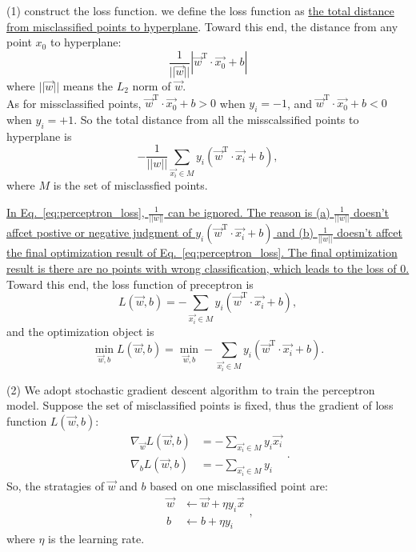 \documentclass[10pt,onecolumn]{book}
\begin{document}
(1) construct the loss function. we define the loss function as \uline{the total distance from misclassified points to hyperplane}. Toward this end, the distance from any point $x_{0}$ to hyperplane:
\begin{equation}
\frac{1}{||\vec{w}||} |\vec{w}^\mathrm{T}  \cdot \vec{x_{0}} + b|
\end{equation}
where ${||\vec{w}||}$ means the $L_{2}$ norm of $\vec{w}$.\\
\indent As for missclassified points, $\vec{w}^\mathrm{T}  \cdot \vec{x_{0}} + b > 0$ when $y_{i}=-1$, and $\vec{w}^\mathrm{T}  \cdot \vec{x_{0}} + b < 0$ when $y_{i}=+1$. So the total distance from all the misscalssified points to hyperplane is 
\begin{equation}\label{eq:perceptron_loss}
-\frac{1}{||w||}\sum_{\vec{x_{i}} \in M} y_{i} (\vec{w}^\mathrm{T}  \cdot \vec{x_{i}} + b),
\end{equation}
where $M$ is the set of misclassfied points.

\indent \uline{In Eq.~\ref{eq:perceptron_loss}, $\frac{1}{||w||}$ can be ignored. The reason is (a) $\frac{1}{||w||}$ doesn't affcet postive or negative judgment of $y_{i} (\vec{w}^\mathrm{T}  \cdot \vec{x_{i}} + b)$ and (b) $\frac{1}{||w||}$ doesn't affcet the final optimization result of Eq.~\ref{eq:perceptron_loss}. The final optimization result is there are no points with wrong classification, which leads to the loss of 0.} Toward this end, the loss function of preceptron is 
\begin{equation}\label{eq:perceptron_loss}
L(\vec{w}, b) = - \sum_{\vec{x_{i}} \in M} y_{i} (\vec{w}^\mathrm{T}  \cdot \vec{x_{i}} + b),
\end{equation}
and the optimization object is 
\begin{equation}\label{eq:perceptron_loss}
\min_{\vec{w}, b}L(\vec{w}, b) = \min_{\vec{w}, b}- \sum_{\vec{x_{i}} \in M} y_{i} (\vec{w}^\mathrm{T}  \cdot \vec{x_{i}} + b).
\end{equation}

(2) We adopt stochastic gradient descent algorithm to train the perceptron model. Suppose the set of misclassified points is fixed, thus the gradient of loss function $L(\vec{w}, b)$:
\begin{equation}
\begin{split}
	\nabla_{\vec{w}}L(\vec{w}, b) & = - \sum_{\vec{x_i} \in M} y_i \vec{x_i} \\
	\nabla_{b}L(\vec{w}, b)       & = - \sum_{\vec{x_i} \in M} y_i
\end{split}.
\end{equation}
So, the stratagies of $\vec{w}$ and $b$ based on one misclassified point are:
\begin{equation}\label{eq:perceptron_parameter_update}
\begin{split}
	\vec{w} & \gets \vec{w} + \eta y_i \vec{x} \\
	b & \gets b + \eta y_i
\end{split},
\end{equation}
where $\eta$ is the learning rate.
\end{document}
